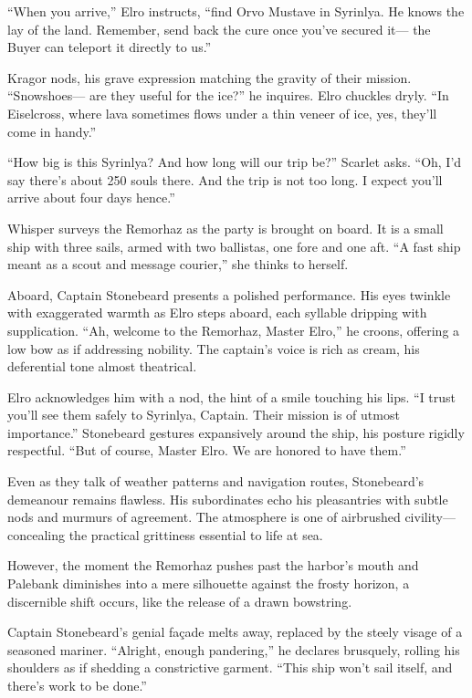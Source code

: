 \documentclass[
  letterpaper,12pt,twoside,twocolumn,openany,
  nodeprecatedcode,bg=full]{dndbook}
\begin{document}
``When you arrive,'' Elro instructs, ``find Orvo Mustave in Syrinlya. He
knows the lay of the land. Remember, send back the cure once you've
secured it--- the Buyer can teleport it directly to us.''

Kragor nods, his grave expression matching the gravity of their mission.
``Snowshoes--- are they useful for the ice?'' he inquires. Elro chuckles
dryly. ``In Eiselcross, where lava sometimes flows under a thin veneer
of ice, yes, they'll come in handy.''

``How big is this Syrinlya? And how long will our trip be?'' Scarlet
asks. ``Oh, I'd say there's about 250 souls there. And the trip is not
too long. I expect you'll arrive about four days hence.''

Whisper surveys the Remorhaz as the party is brought on board. It is a
small ship with three sails, armed with two ballistas, one fore and one
aft. ``A fast ship meant as a scout and message courier,'' she thinks to
herself.

Aboard, Captain Stonebeard presents a polished performance. His eyes
twinkle with exaggerated warmth as Elro steps aboard, each syllable
dripping with supplication. ``Ah, welcome to the Remorhaz, Master
Elro,'' he croons, offering a low bow as if addressing nobility. The
captain's voice is rich as cream, his deferential tone almost
theatrical.

Elro acknowledges him with a nod, the hint of a smile touching his lips.
``I trust you'll see them safely to Syrinlya, Captain. Their mission is
of utmost importance.'' Stonebeard gestures expansively around the ship,
his posture rigidly respectful. ``But of course, Master Elro. We are
honored to have them.''

Even as they talk of weather patterns and navigation routes,
Stonebeard's demeanour remains flawless. His subordinates echo his
pleasantries with subtle nods and murmurs of agreement. The atmosphere
is one of airbrushed civility--- concealing the practical grittiness
essential to life at sea.

However, the moment the Remorhaz pushes past the harbor's mouth and
Palebank diminishes into a mere silhouette against the frosty horizon, a
discernible shift occurs, like the release of a drawn bowstring.

Captain Stonebeard's genial façade melts away, replaced by the steely
visage of a seasoned mariner. ``Alright, enough pandering,'' he declares
brusquely, rolling his shoulders as if shedding a constrictive garment.
``This ship won't sail itself, and there's work to be done.''
\end{document}
